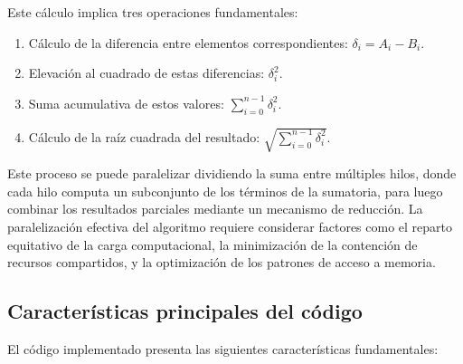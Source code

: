         Este cálculo implica tres operaciones fundamentales:
        
        \begin{enumerate}
        
            \item Cálculo de la diferencia entre elementos correspondientes: $\delta_i = A_i - B_i$.
            
            \item Elevación al cuadrado de estas diferencias: $\delta_i^2$.

            \item Suma acumulativa de estos valores: $\sum_{i=0}^{n-1} \delta_i^2$.
            
            \item Cálculo de la raíz cuadrada del resultado: $\sqrt{\sum_{i=0}^{n-1} \delta_i^2}$.
            
        \end{enumerate}

        Este proceso se puede paralelizar dividiendo la suma entre múltiples hilos, donde cada hilo computa un subconjunto de los términos de la sumatoria, para luego combinar los resultados parciales mediante un mecanismo de reducción. La paralelización efectiva del algoritmo requiere considerar factores como el reparto equitativo de la carga computacional, la minimización de la contención de recursos compartidos, y la optimización de los patrones de acceso a memoria.

    \subsection{Características principales del código}

        El código implementado presenta las siguientes características fundamentales:
        
